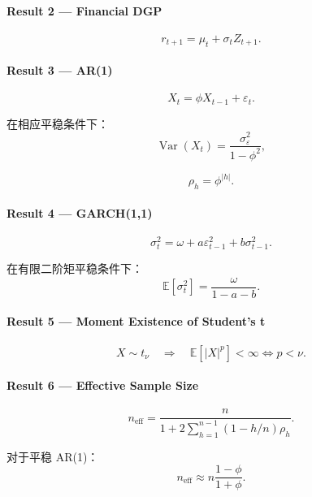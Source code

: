 \hypertarget{part-4-58-0007-result-2-financial-dgp}{%
\paragraph{Result 2 --- Financial DGP}\label{part-4-58-0007-result-2-financial-dgp}}

\[r_{t+1}
=
\mu_t+\sigma_tZ_{t+1}.\]

\hypertarget{part-4-58-0007-result-3-ar1}{%
\paragraph{Result 3 --- AR(1)}\label{part-4-58-0007-result-3-ar1}}

\[X_t=\phi X_{t-1}+\varepsilon_t.\]

在相应平稳条件下：
\[\operatorname{Var}(X_t)
=
\frac{\sigma_\varepsilon^2}{1-\phi^2},\]

\[\rho_h=\phi^{|h|}.\]

\hypertarget{part-4-58-0007-result-4-garch11}{%
\paragraph{Result 4 --- GARCH(1,1)}\label{part-4-58-0007-result-4-garch11}}

\[\sigma_t^2
=
\omega+a\varepsilon_{t-1}^2+b\sigma_{t-1}^2.\]

在有限二阶矩平稳条件下：
\[\boxed{
\mathbb E[\sigma_t^2]
=
\frac{\omega}{1-a-b}.
}\]

\hypertarget{part-4-58-0007-result-5-moment-existence-of-students-t}{%
\paragraph{Result 5 --- Moment Existence of Student's t}\label{part-4-58-0007-result-5-moment-existence-of-students-t}}

\[X\sim t_\nu
\quad\Longrightarrow\quad
\mathbb E[|X|^p]<\infty
\iff p<\nu.\]

\hypertarget{part-4-58-0007-result-6-effective-sample-size}{%
\paragraph{Result 6 --- Effective Sample Size}\label{part-4-58-0007-result-6-effective-sample-size}}

\[n_{\mathrm{eff}}
=
\frac{n}{
1+2\sum_{h=1}^{n-1}(1-h/n)\rho_h
}.\]

对于平稳 AR(1)：
\[\boxed{
n_{\mathrm{eff}}
\approx
n\frac{1-\phi}{1+\phi}.
}\]


